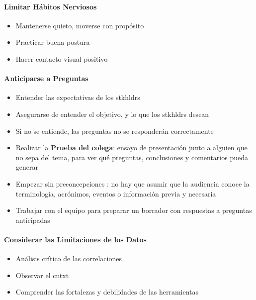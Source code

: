 \paragraph{Limitar Hábitos Nerviosos}
\begin{itemize}
    \item {Mantenerse quieto, moverse con propósito}
    \item {Practicar buena postura}
    \item {Hacer contacto visual positivo}
\end{itemize}

\paragraph{Anticiparse a Preguntas}
\begin{itemize}
    \item {Entender las expectativas de los \gls{stkhldrs}}
    \item {Asegurarse de entender el objetivo, y lo que los \gls{stkhldrs} desean}
    \item {Si no se entiende, las preguntas no se responderán correctamente}
    \item {Realizar la \textbf{Prueba del colega}: ensayo de presentación junto a alguien que no sepa del tema, para ver qué preguntas, conclusiones y comentarios pueda generar}
    \item {Empezar sin preconcepciones : no hay que asumir que la audiencia conoce la terminología, acrónimos, eventos o información previa y necesaria}
    \item {Trabajar con el equipo para preparar un borrador con respuestas a preguntas anticipadas}
\end{itemize}

\paragraph{Considerar las Limitaciones de los Datos}
\begin{itemize}
    \item {Análisis crítico de las correlaciones}
    \item {Observar el \gls{cntxt}}
    \item {Comprender las fortalezas y debilidades de las herramientas}
\end{itemize}

